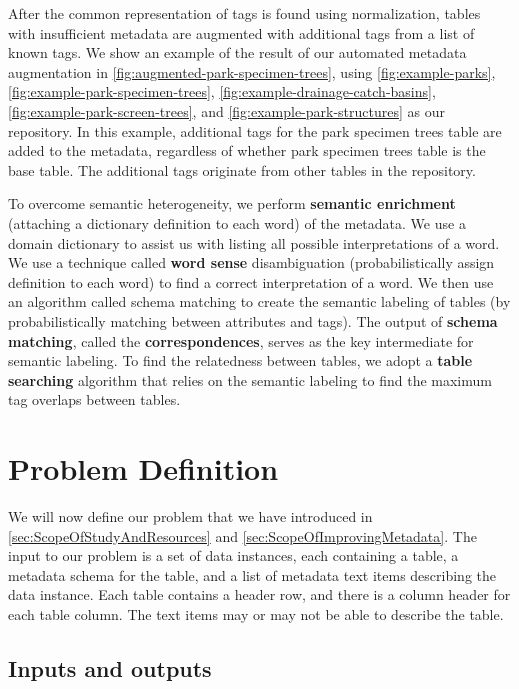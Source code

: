 After the common representation of tags is found using normalization, tables with insufficient metadata are augmented with additional tags from a list of known tags. We show an example of the result of our automated metadata augmentation in \autoref{fig:augmented-park-specimen-trees}, using \autoref{fig:example-parks}, \autoref{fig:example-park-specimen-trees}, \autoref{fig:example-drainage-catch-basins}, \autoref{fig:example-park-screen-trees}, and \autoref{fig:example-park-structures} as our repository. In this example, additional tags for the park specimen trees table are added to the metadata, regardless of whether park specimen trees table is the base table. The additional tags originate from other tables in the repository.

To overcome semantic heterogeneity, we perform \textbf{\gls{semantic enrichment}} (attaching a dictionary definition to each word) of the metadata. We use a domain dictionary to assist us with listing all possible interpretations of a word. We use a technique called \textbf{\gls{word sense}} disambiguation (probabilistically assign definition to each word) to find a correct interpretation of a word. We then use an algorithm called schema matching to create the semantic labeling of tables (by probabilistically matching between attributes and tags). The output of \textbf{\gls{schema matching}}, called the \textbf{\glspl{correspondence}}, serves as the key intermediate for semantic labeling. To find the relatedness between tables, we adopt a \textbf{\gls{table searching}} algorithm that relies on the semantic labeling to find the maximum tag overlaps between tables.

\section{Problem Definition}
\label{sec:ProblemDefinition}

We will now define our problem that we have introduced in \autoref{sec:ScopeOfStudyAndResources} and \autoref{sec:ScopeOfImprovingMetadata}. The input to our problem is a set of data instances, each containing a table, a metadata schema for the table, and a list of metadata text items describing the data instance. Each table contains a header row, and there is a column header for each table column. The text items may or may not be able to describe the table.

\subsection{Inputs and outputs}

